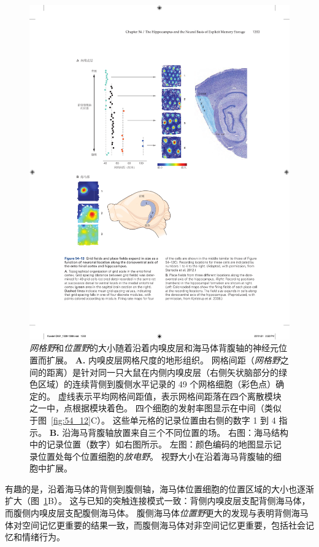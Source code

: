 \begin{figure}[htbp]
	\centering
	\includegraphics[width=0.95\linewidth]{chap54/fig_54_13}
	\caption{\textit{网格野}和\textit{位置野}的大小随着沿着内嗅皮层和海马体背腹轴的神经元位置而扩展。
		\textbf{A.} 内嗅皮层网格尺度的地形组织。
		网格间距（\textit{网格野}之间的距离）是针对同一只大鼠在内侧内嗅皮层（右侧矢状脑部分的绿色区域）的连续背侧到腹侧水平记录的 49 个网格细胞（彩色点）确定的。
		虚线表示平均网格间距值，表示网格间距落在四个离散模块之一中，点根据模块着色。
		四个细胞的发射率图显示在中间（类似于图~\ref{fig:54_12}C）。
		这些单元格的记录位置由右侧的数字 1 到 4 指示\cite{stensola2012entorhinal}。
		\textbf{B.} 沿海马背腹轴放置来自三个不同位置的场。
		右图：海马结构中的记录位置（数字）如右图所示。
		左图：颜色编码的地图显示记录位置处每个位置细胞的\textit{放电野}。
		视野大小在沿着海马背腹轴的细胞中扩展\cite{kjelstrup2008finite}。}
	\label{fig:54_13}
\end{figure}


有趣的是，沿着海马体的背侧到腹侧轴，海马体位置细胞的位置区域的大小也逐渐扩大（图~\ref{fig:54_13}B）。
这与已知的突触连接模式一致：背侧内嗅皮层支配背侧海马体，而腹侧内嗅皮层支配腹侧海马体。
腹侧海马体\textit{位置野}更大的发现与表明背侧海马体对空间记忆更重要的结果一致，而腹侧海马体对非空间记忆更重要，包括社会记忆和情绪行为。


